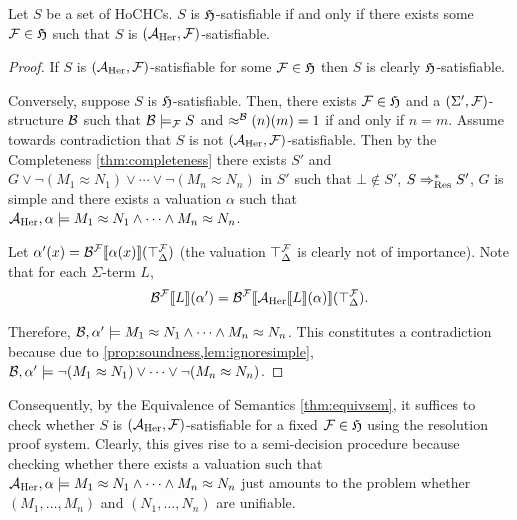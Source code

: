 \documentclass[a4paper,twoside,notitlepage,openright,11pt]{report}
\begin{document}
\begin{proposition}
  \label{prop:Herbrand}
  Let $S$ be a set of HoCHCs. 
  $S$ is $\mathfrak H$-satisfiable if and only if there exists some $\mathcal F\in\mathfrak H$ such that $S$ is $(\mathcal A_{\operatorname{Her}},\mathcal F)$-satisfiable.
\end{proposition}
\begin{proof}
  If $S$ is $(\mathcal A_{\operatorname{Her}},\mathcal F)$-satisfiable for some $\mathcal F\in\mathfrak H$ then $S$ is clearly $\mathfrak H$-satisfiable.

Conversely, suppose $S$ is $\mathfrak H$-satisfiable. Then, there exists $\mathcal F\in\mathfrak H$ and a $(\Sigma',\mathcal F)$-structure $\mathcal B$ such that $\mathcal B\models_\mathcal F S$ and $\approx^\mathcal B(n)(m)=1$ if and only if $n=m$. Assume towards contradiction that $S$ is not $(\mathcal A_{\operatorname{Her}},\mathcal F)$-satisfiable. Then by the Completeness \cref{thm:completeness} there exists $S'$ and $G\lor\neg (M_1\approx N_1)\lor\cdots\lor\neg (M_n\approx N_n)$ in $S'$ such that $\bot\not\in S'$, $S\Rightarrow_{\operatorname{Res}}^*S'$, $G$ is simple and there exists a valuation $\alpha$ such that $\mathcal A_{\operatorname{Her}},\alpha\models M_1\approx N_1\land\cdots\land M_n\approx N_n$.

Let $\alpha'(x)={\mathcal B}^\mathcal F\llbracket\alpha(x)\rrbracket(\top_\Delta^\mathcal F)$ (the valuation $\top_\Delta^\mathcal F$ is clearly not of importance).
Note that for each $\Sigma$-term $L$,
\begin{align*}
  {\mathcal B}^\mathcal F\llbracket L\rrbracket(\alpha')={\mathcal B}^\mathcal F\llbracket{\mathcal A_{\operatorname{Her}}}\llbracket L\rrbracket(\alpha)\rrbracket(\top_\Delta^\mathcal F).
\end{align*}

Therefore, $\mathcal B,\alpha'\models M_1\approx N_1\land\cdots\land M_n\approx N_n$. This constitutes a contradiction because due to \cref{prop:soundness,lem:ignoresimple}, $\mathcal B,\alpha'\models\neg (M_1\approx N_1)\lor\cdots\lor\neg (M_n\approx N_n)$. 
\end{proof}
Consequently, by the Equivalence of Semantics \cref{thm:equivsem}, it suffices to check whether $S$ is $(\mathcal A_{\operatorname{Her}},\mathcal F)$-satisfiable for a fixed $\mathcal F\in\mathfrak H$ using the resolution proof system. Clearly, this gives rise to a semi-decision procedure because checking whether there exists a valuation such that $\mathcal A_{\operatorname{Her}},\alpha\models M_1\approx N_1\land\cdots\land M_n\approx N_n$ just amounts to the problem whether $(M_1,\ldots,M_n)$ and $(N_1,\ldots,N_n)$ are unifiable.
\end{document}
